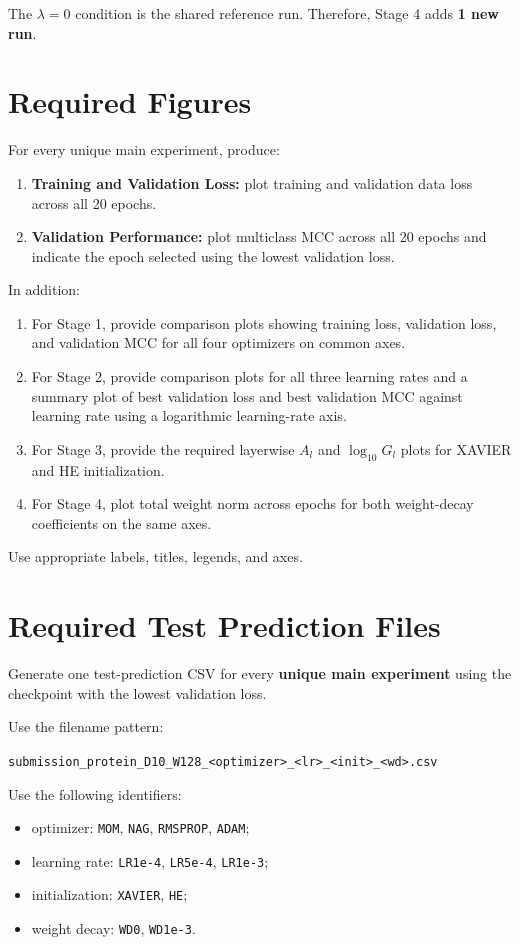 \documentclass[11pt]{article}
\begin{document}
The $\lambda=0$ condition is the shared reference run. Therefore, Stage 4 adds \textbf{1 new run}.

\section{Required Figures}
For every unique main experiment, produce:
\begin{enumerate}
    \item \textbf{Training and Validation Loss:} plot training and validation data loss across all 20 epochs.
    \item \textbf{Validation Performance:} plot multiclass MCC across all 20 epochs and indicate the epoch selected using the lowest validation loss.
\end{enumerate}

In addition:
\begin{enumerate}
    \item For Stage 1, provide comparison plots showing training loss, validation loss, and validation MCC for all four optimizers on common axes.
    \item For Stage 2, provide comparison plots for all three learning rates and a summary plot of best validation loss and best validation MCC against learning rate using a logarithmic learning-rate axis.
    \item For Stage 3, provide the required layerwise $A_l$ and $\log_{10}G_l$ plots for XAVIER and HE initialization.
    \item For Stage 4, plot total weight norm across epochs for both weight-decay coefficients on the same axes.
\end{enumerate}

Use appropriate labels, titles, legends, and axes.

\section{Required Test Prediction Files}
Generate one test-prediction CSV for every \textbf{unique main experiment} using the checkpoint with the lowest validation loss.

Use the filename pattern:
\begin{center}
\texttt{submission\_protein\_D10\_W128\_<optimizer>\_<lr>\_<init>\_<wd>.csv}
\end{center}

Use the following identifiers:
\begin{itemize}
    \item optimizer: \texttt{MOM}, \texttt{NAG}, \texttt{RMSPROP}, \texttt{ADAM};
    \item learning rate: \texttt{LR1e-4}, \texttt{LR5e-4}, \texttt{LR1e-3};
    \item initialization: \texttt{XAVIER}, \texttt{HE};
    \item weight decay: \texttt{WD0}, \texttt{WD1e-3}.
\end{itemize}
\end{document}
